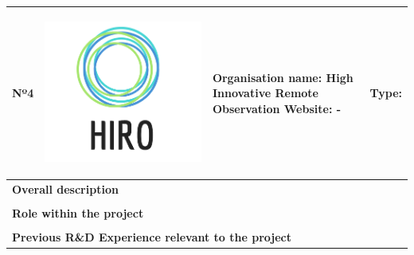 \begin{longtable}[H]{|p{0.7cm}|p{4cm}|p{7cm}|p{1.3cm}|}
	\hline
	\begin{center} Nº4 \end{center} & \begin{center} \includegraphics[scale=0.07]{./logos/logo} \end{center} & \begin{center} \textbf{Organisation name:} High Innovative Remote Observation \newline \textbf{Website:} - \end{center} & \begin{center} Type: \end{center} \\ \hline
	
	\multicolumn{4}{|p{13cm}|}{\textbf{Overall description}}  \\ \hline
	
	\multicolumn{4}{|p{14.5cm}|}{}  \\ \hline
	
	\multicolumn{4}{|p{13cm}|}{\textbf{Role within the project}}   \\ \hline
	
	\multicolumn{4}{|p{14.5cm}|}{}  \\ \hline
	
	\multicolumn{4}{|p{13cm}|}{\textbf{Previous R\&D Experience relevant to the project}}  \\ \hline
	

\end{longtable}

